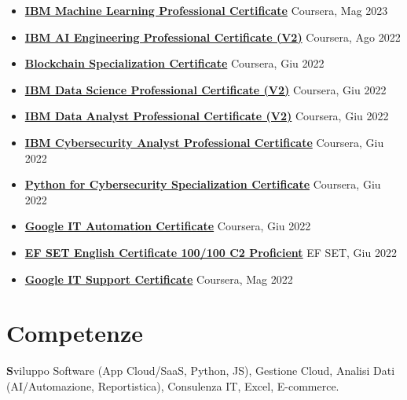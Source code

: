 \documentclass[a4paper,12pt]{article}
\begin{document}
\begin{itemize}[leftmargin=*,itemsep=3pt,parsep=0pt]
\item \textbf{\href{https://www.credly.com/badges/e562c28b-730a-444b-9776-9d1d3429b6a8/linked_in_profile}{IBM Machine Learning Professional Certificate}} \hfill \textnormal{Coursera, Mag 2023}
\item \textbf{\href{https://www.credly.com/badges/40d36ac5-31a2-4ce0-a3c0-b2ea91ff4b64/linked_in_profile}{IBM AI Engineering Professional Certificate (V2)}} \hfill \textnormal{Coursera, Ago 2022}
\item \textbf{\href{https://www.coursera.org/account/accomplishments/specialization/certificate/7RQG4Q277CA2}{Blockchain Specialization Certificate}} \hfill \textnormal{Coursera, Giu 2022}
\item \textbf{\href{https://www.credly.com/badges/41676071-2178-4f58-8db3-3622a90eecfd/linked_in_profile}{IBM Data Science Professional Certificate (V2)}} \hfill \textnormal{Coursera, Giu 2022}
\item \textbf{\href{https://www.credly.com/badges/d7986998-a9ac-4adc-8b2d-cf1edeca2301/linked_in_profile}{IBM Data Analyst Professional Certificate (V2)}} \hfill \textnormal{Coursera, Giu 2022}
\item \textbf{\href{https://www.credly.com/badges/ba500085-e96c-4704-8b80-3d2062089151/linked_in_profile}{IBM Cybersecurity Analyst Professional Certificate}} \hfill \textnormal{Coursera, Giu 2022}
\item \textbf{\href{https://www.coursera.org/account/accomplishments/specialization/certificate/3MEHP7XBU26B}{Python for Cybersecurity Specialization Certificate}} \hfill \textnormal{Coursera, Giu 2022}
\item \textbf{\href{https://www.credly.com/badges/0d6aeb02-1078-4c7b-bdd5-57cc3c2c7d8d/linked_in_profile}{Google IT Automation Certificate}} \hfill \textnormal{Coursera, Giu 2022}
\item \textbf{\href{https://www.efset.org/cert/NeK5Ry}{EF SET English Certificate 100/100 C2 Proficient}} \hfill \textnormal{EF SET, Giu 2022}
\item \textbf{\href{https://www.udemy.com/certificate/UC-250c1c0b-72ce-41ac-bdbc-da21e3e8ee85/}{Google IT Support Certificate}} \hfill \textnormal{Coursera, Mag 2022}

\end{itemize}

\section{Competenze}
\noindent\textbf Sviluppo Software (App Cloud/SaaS, Python, JS), Gestione Cloud, Analisi Dati (AI/Automazione, Reportistica), Consulenza IT, Excel, E-commerce.
\end{document}
